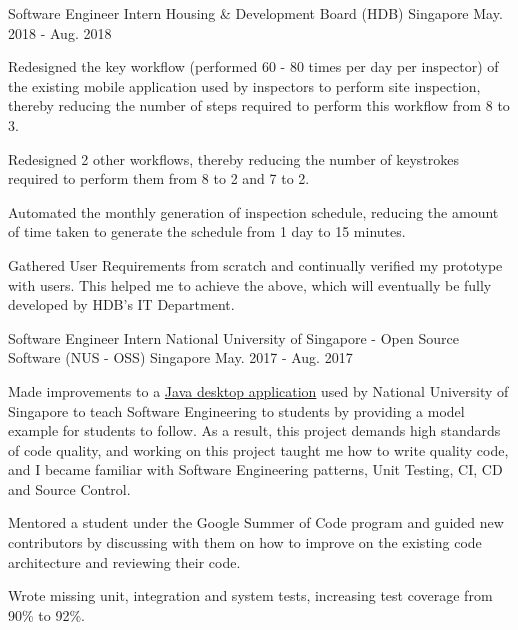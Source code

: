 \begin{cventries}
  \cventry
    {Software Engineer Intern} %
    {Housing \& Development Board (HDB)} %
    {Singapore} %
    {May. 2018 - Aug. 2018} %
    {
      \begin{cvitems} %
        \item {Redesigned the key workflow (performed 60 - 80 times per day per inspector) of the existing mobile application used by inspectors to perform site inspection, thereby reducing the number of steps required to perform this workflow from 8 to 3.}
        \item {Redesigned 2 other workflows, thereby reducing the number of keystrokes required to perform them from 8 to 2 and 7 to 2.}
        \item {Automated the monthly generation of inspection schedule, reducing the amount of time taken to generate the schedule from 1 day to 15 minutes.}
        \item {Gathered User Requirements from scratch and continually verified my prototype with users. This helped me to achieve the above, which will eventually be fully developed by HDB's IT Department.}
      \end{cvitems}
    }

  \cventry
    {Software Engineer Intern} %
    {National University of Singapore - Open Source Software (NUS - OSS)} %
    {Singapore} %
    {May. 2017 - Aug. 2017} %
    {
      \begin{cvitems} %
        \item {Made improvements to a \href{https://github.com/issues?utf8=\%E2\%9C\%93&q=repo\%3Ase-edu\%2Faddressbook-level4+involves\%3AZhiyuan-Amos}{Java desktop application} used by National University of Singapore to teach Software Engineering to students by providing a model example for students to follow. As a result, this project demands high standards of code quality, and working on this project taught me how to write quality code, and I became familiar with Software Engineering patterns, Unit Testing, CI, CD and Source Control.}
        \item {Mentored a student under the Google Summer of Code program and guided new contributors by discussing with them on how to improve on the existing code architecture and reviewing their code.}
        \item {Wrote missing unit, integration and system tests, increasing test coverage from 90\% to 92\%.}
      \end{cvitems}
    }


\end{cventries}
